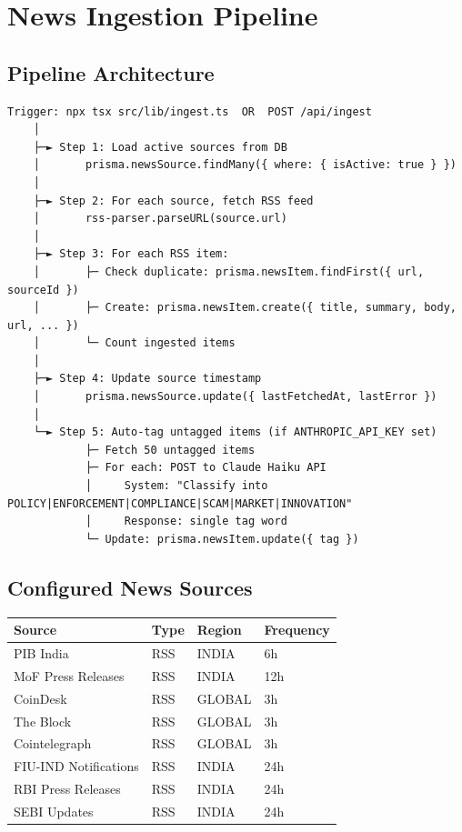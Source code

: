 \documentclass[12pt,a4paper]{article}
\begin{document}
\section{News Ingestion Pipeline}

\subsection{Pipeline Architecture}

\begin{verbatim}
Trigger: npx tsx src/lib/ingest.ts  OR  POST /api/ingest
    │
    ├─► Step 1: Load active sources from DB
    │       prisma.newsSource.findMany({ where: { isActive: true } })
    │
    ├─► Step 2: For each source, fetch RSS feed
    │       rss-parser.parseURL(source.url)
    │
    ├─► Step 3: For each RSS item:
    │       ├─ Check duplicate: prisma.newsItem.findFirst({ url, sourceId })
    │       ├─ Create: prisma.newsItem.create({ title, summary, body, url, ... })
    │       └─ Count ingested items
    │
    ├─► Step 4: Update source timestamp
    │       prisma.newsSource.update({ lastFetchedAt, lastError })
    │
    └─► Step 5: Auto-tag untagged items (if ANTHROPIC_API_KEY set)
            ├─ Fetch 50 untagged items
            ├─ For each: POST to Claude Haiku API
            │     System: "Classify into POLICY|ENFORCEMENT|COMPLIANCE|SCAM|MARKET|INNOVATION"
            │     Response: single tag word
            └─ Update: prisma.newsItem.update({ tag })
\end{verbatim}

\subsection{Configured News Sources}

\begin{center}
\begin{tabular}{llll}
\toprule
\textbf{Source} & \textbf{Type} & \textbf{Region} & \textbf{Frequency} \\
\midrule
PIB India & RSS & INDIA & 6h \\
MoF Press Releases & RSS & INDIA & 12h \\
CoinDesk & RSS & GLOBAL & 3h \\
The Block & RSS & GLOBAL & 3h \\
Cointelegraph & RSS & GLOBAL & 3h \\
FIU-IND Notifications & RSS & INDIA & 24h \\
RBI Press Releases & RSS & INDIA & 24h \\
SEBI Updates & RSS & INDIA & 24h \\
\bottomrule
\end{tabular}
\end{center}
\end{document}
